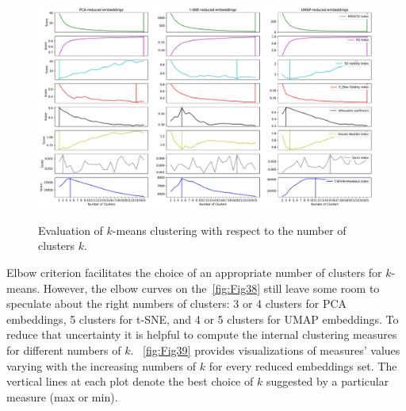 \begin{figure}[!ht]
	\centering
	\includegraphics[width=1.0\textwidth]{images/evaluations/Fig39.pdf}\\
	\caption{Evaluation of $k$-means clustering with respect to the number of clusters $k$.}
	\label{fig:Fig39}
\end{figure}

Elbow criterion facilitates the choice of an appropriate number of clusters for $k$-means. However, the elbow curves on the~\autoref{fig:Fig38} still leave some room to speculate about the right numbers of clusters: 3 or 4 clusters for PCA embeddings, 5 clusters for t-SNE, and 4 or 5 clusters for UMAP embeddings. To reduce that uncertainty it is helpful to compute the internal clustering measures for different numbers of $k$. ~\autoref{fig:Fig39} provides visualizations of measures' values varying with the increasing numbers of $k$ for every reduced embeddings set. The vertical lines at each plot denote the best choice of $k$ suggested by a particular measure (max or min).

